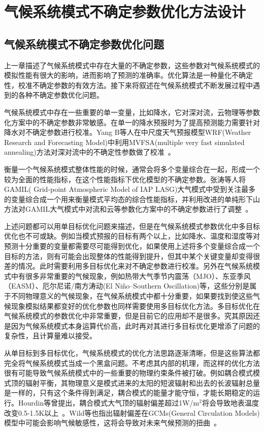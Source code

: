 \chapter{气候系统模式不确定参数优化方法设计}
\label{tu:tune}
\section{气候系统模式不确定参数优化问题}

上一章描述了气候系统模式中存在大量的不确定参数，这些参数对气候系统模式的模拟性能有很大的影响，进而影响了预测的准确率。优化算法是一种量化不确定性，校准不确定参数的有效方法。接下来将叙述在气候系统模式不断发展过程中遇到的各种不确定参数优化问题。

气候系统模式中存在一些重要的单一变量，比如降水，它对深对流，云物理等参数化方案中的不确定参数非常敏感。在单一的降水预报时为了提高预测能力需要针对降水对不确定参数进行校准。Yang B等人在中尺度天气预报模型WRF(Weather Research and Forecasting Model)中利用MVFSA(multiple very fast simulated annealing)方法对深对流中的不确定性参数做了校准~\cite{yang2015calibration}。

衡量一个气候系统模式整体性能的时候，通常会将多个变量综合在一起，形成一个较为全面的性能指标，在这个性能指标下优化模型的不确定参数。张涛等人将GAMIL( Grid-point Atmospheric Model of IAP LASG)大气模式中受到关注最多的变量综合成一个用来衡量模式平均态的综合性能指标，并利用改进的单纯形下山方法对GAMIL大气模式中对流和云等参数化方案中的不确定参数进行了调整~\cite{zhang2015automatic}。

上述问题都可以用单目标优化问题来描述，但是在气候系统模式参数优化中多目标优化也不可或缺。例如当模式预报的目标有两个以上，比如降水、温度和湿度等对预测十分重要的变量都需要尽可能得到优化，如果使用上述将多个变量综合成一个目标的方法，则有可能会出现整体的性能得到提升，但其中某个关键变量却变得很差的情况。此时需要利用多目标优化来对不确定参数进行校准。另外在气候系统模式中有很多非常重要的气候现象，例如热带大气季节内震荡（MJO）、东亚季风（EASM）、厄尔尼诺/南方涛动(El Niño–Southern Oscillation)等，这些分别是属于不同物理意义的气候现象，在气候系统模式中都十分重要，如果要找到使这些气候现象模拟结果都变好的优化参数也同样需要使用多目标优化方法。多目标优化在气候系统模式的参数优化中非常重要，但是目前它的应用却不是很多。究其原因还是因为气候系统模式本身运算代价高，此时再对其进行多目标优化更增添了问题的复杂性，且计算量难以接受。

从单目标到多目标优化，气候系统模式的优化方法思路逐渐清晰，但是这些算法都完全将气候系统模式当成一个黑盒问题。不考虑其内部的机理，而这样的优化方法很有可能导致气候系统模式中的一些重要的物理约束条件被打破。例如耦合模式模式顶的辐射平衡，其物理意义是模式进来的太阳的短波辐射和出去的长波辐射总量是一样的，只有这个条件得到满足，耦合模式的能量才能守恒，才能长期稳定的运行。Hourdin等曾提出，耦合模式大气顶的辐射偏差超过1W/m$^2$将会导致地表温度改变0.5-1.5K以上~\cite{hourdin2017art}。Wild等也指出辐射偏差在GCMs(General Circulation Models)模型中可能会影响气候敏感性，这将会导致对未来气候预测的扭曲~\cite{wild2008short}。

